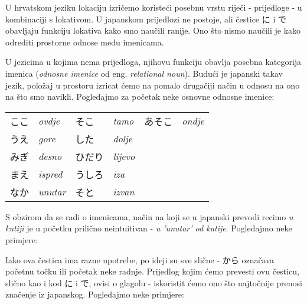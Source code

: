 
\author{Tomislav Mamić}

	
	U hrvatskom jeziku lokaciju izričemo koristeći posebnu vrstu riječi - prijedloge - u kombinaciji s lokativom. U japanskom prijedlozi ne postoje, ali čestice に i で obavljaju funkciju lokativa kako smo naučili ranije. Ono što nismo naučili je kako odrediti prostorne odnose među imenicama.
	
	
	U jezicima u kojima nema prijedloga, njihovu funkciju obavlja posebna kategorija imenica (\textit{odnosne imenice} od eng. \textit{relational noun}). Budući je japanski takav jezik, položaj u prostoru izricat ćemo na pomalo drugačiji način u odnosu na ono na što smo navikli. Pogledajmo za početak neke osnovne odnosne imenice:
	
	\vspace{10pt}
	\begin{tabular}{l l l l l l}
		ここ&\textit{ovdje}&そこ&\textit{tamo}&あそこ&\textit{ondje}\\
		うえ&\textit{gore}&した&\textit{dolje}&&\\
		みぎ&\textit{desno}&ひだり&\textit{lijevo}&&\\
		まえ&\textit{ispred}&うしろ&\textit{iza}&&\\
		なか&\textit{unutar}&そと&\textit{izvan}&&\\
	\end{tabular}

	\vspace{10pt}
	S obzirom da se radi o imenicama, način na koji se u japanski prevodi recimo \textit{u kutiji} je u početku prilično neintuitivan - \textit{u 'unutar' od kutije}. Pogledajmo neke primjere:
	
	\begin{reibun}
	\end{reibun}

	
	Iako ova čestica ima razne upotrebe, po ideji su sve slične - から označava početnu točku ili početak neke radnje. Prijedlog kojim ćemo prevesti ovu česticu, slično kao i kod に i で, ovisi o glagolu - iskoristit ćemo ono što najtočnije prenosi značenje iz japanskog. Pogledajmo neke primjere:
	
